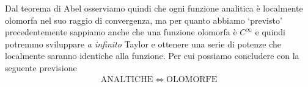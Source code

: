 \begin{remark}
	Dal teorema di Abel osserviamo quindi che ogni funzione analitica è localmente olomorfa nel suo raggio di convergenza, ma per quanto abbiamo `previsto' precedentemente sappiamo anche che una funzione olomorfa è $C^\infty$ e quindi potremmo sviluppare \textit{a infinito} Taylor e ottenere una serie di potenze che localmente saranno identiche alla funzione. Per cui possiamo concludere con la seguente previsione 
	\begin{equation*}
	\begin{aligned}
		\textrm{ANALTICHE} \Longleftrightarrow \mathrm{OLOMORFE}
	\end{aligned}
	\end{equation*}
\end{remark}

